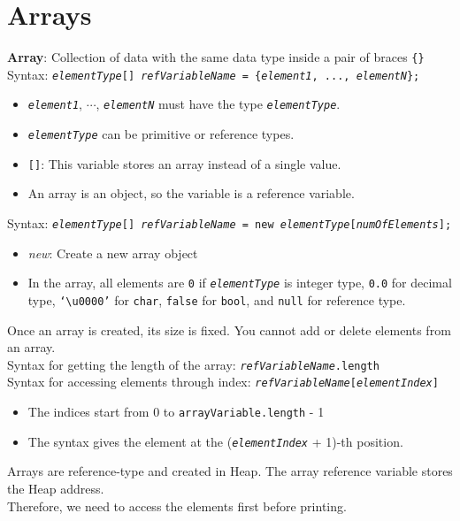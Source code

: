 \documentclass{article}
\begin{document}
\section{Arrays}
\textbf{Array}: Collection of data with the same data type inside a pair of braces \texttt{\{\}}\\
Syntax: \texttt{\textit{elementType}[] \textit{refVariableName} = \{\textit{element1}, ..., \textit{elementN}\};}
\begin{itemize}
	\item \texttt{\textit{element1}}, $\cdots$, \texttt{\textit{elementN}} must have the type \texttt{\textit{elementType}}.
	\item \texttt{\textit{elementType}} can be primitive or reference types.
	\item \texttt{[]}: This variable stores an array instead of a single value.
	\item An array is an object, so the variable is a reference variable.
\end{itemize}
Syntax: \texttt{\textit{elementType}[] \textit{refVariableName} = new \textit{elementType}[\textit{numOfElements}];}
\begin{itemize}
	\item \textit{new}: Create a new array object
	\item In the array, all elements are \texttt{0} if \texttt{\textit{elementType}} is integer type, \texttt{0.0} for decimal type, \texttt{`\textbackslash u0000'} for \texttt{char}, \texttt{false} for \texttt{bool}, and \texttt{null} for reference type.
\end{itemize}
Once an array is created, its size is fixed. You cannot add or delete elements from an array.\\
Syntax for getting the length of the array: \texttt{\textit{refVariableName}.length}\\
Syntax for accessing elements through index:
\texttt{\textit{refVariableName}[\textit{elementIndex}]}
\begin{itemize}
	\item The indices start from 0 to \texttt{arrayVariable.length} - 1
	\item The syntax gives the element at the (\texttt{\textit{elementIndex}} + 1)-th position.
\end{itemize}
Arrays are reference-type and created in Heap. The array reference variable stores the Heap address.\\
Therefore, we need to access the elements first before printing.
\end{document}
